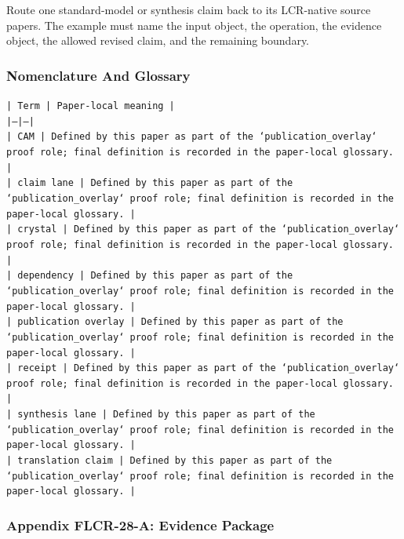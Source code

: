 \documentclass[11pt]{article}
\begin{document}
Route one standard-model or synthesis claim back to its LCR-native source papers. The example must name the input object, the operation,
the evidence object, the allowed revised claim, and the remaining boundary.

\subsubsection*{Nomenclature And Glossary}

\noindent\texttt{| Term | Paper-local meaning |}\\
\noindent\texttt{|---|---|}\\
\noindent\texttt{| CAM | Defined by this paper as part of the `publication\_overlay` proof role; final definition is recorded in the paper-local glossary. |}\\
\noindent\texttt{| claim lane | Defined by this paper as part of the `publication\_overlay` proof role; final definition is recorded in the paper-local glossary. |}\\
\noindent\texttt{| crystal | Defined by this paper as part of the `publication\_overlay` proof role; final definition is recorded in the paper-local glossary. |}\\
\noindent\texttt{| dependency | Defined by this paper as part of the `publication\_overlay` proof role; final definition is recorded in the paper-local glossary. |}\\
\noindent\texttt{| publication overlay | Defined by this paper as part of the `publication\_overlay` proof role; final definition is recorded in the paper-local glossary. |}\\
\noindent\texttt{| receipt | Defined by this paper as part of the `publication\_overlay` proof role; final definition is recorded in the paper-local glossary. |}\\
\noindent\texttt{| synthesis lane | Defined by this paper as part of the `publication\_overlay` proof role; final definition is recorded in the paper-local glossary. |}\\
\noindent\texttt{| translation claim | Defined by this paper as part of the `publication\_overlay` proof role; final definition is recorded in the paper-local glossary. |}\\

\subsubsection*{Appendix FLCR-28-A: Evidence Package}
\end{document}
